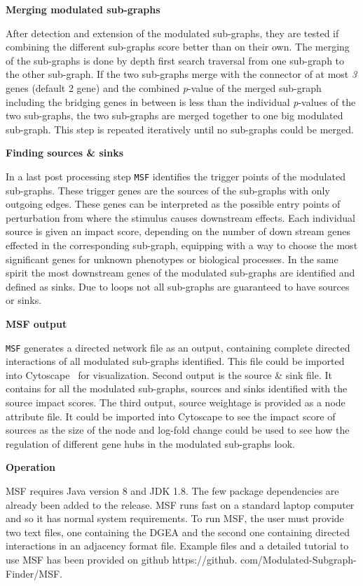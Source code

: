 \documentclass[10pt,a4paper,twocolumn]{article}
\begin{document}
	\textbf{Merging modulated sub-graphs}
	
	After detection and extension of the modulated sub-graphs, they are tested
	if combining the different sub-graphs score better than on their own. The merging of the sub-graphs is done by depth first search traversal from one sub-graph to the other sub-graph. If the two sub-graphs merge
	with the connector of at most \emph{3} genes (default 2 gene) and the
	combined \textit{p}-value of the merged sub-graph including the bridging
	genes in between is less than the individual \textit{p}-values of the two
	sub-graphs, the two sub-graphs are merged together to one big modulated
	sub-graph. This step is repeated iteratively until no sub-graphs could be
	merged.\newline
	
	\textbf{Finding sources \& sinks}
	
	In a last post processing step \texttt{MSF} identifies the trigger points
	of the modulated sub-graphs. These trigger genes are the sources of the
	sub-graphs with only outgoing edges. These genes can be interpreted as the
	possible entry points of perturbation from where the stimulus causes
	downstream effects. Each individual source is given an impact score, depending on the number of down stream genes effected in the corresponding sub-graph, equipping with a way to choose the most significant genes for unknown phenotypes or biological processes. In the same spirit the most downstream genes of the
	modulated sub-graphs are identified and defined as sinks. Due to loops not all
	sub-graphs are guaranteed to have sources or sinks.
	
	
	\textbf{MSF output}
	
	\texttt{MSF} generates a directed network file as an output, containing complete directed interactions of all modulated sub-graphs identified. This file could be imported into Cytoscape~\cite{Cyto} for visualization. Second output is the source \& sink file. It contains for all the modulated sub-graphs, sources and sinks identified with the source impact scores. The third output, source weightage is provided as a node attribute file. It could be imported into Cytoscape to see the impact score of sources as the size of the node and log-fold change could be used to see how the regulation of different gene hubs in the modulated sub-graphs look.
	
	\textbf{Operation}
	
	MSF requires Java version 8 and JDK 1.8. The few package dependencies are already been added to the release. MSF runs fast on a standard laptop computer and so it has normal system requirements. To run MSF, the user must provide two text files, one containing the DGEA and the second one containing directed interactions in an adjacency format file. Example files and a detailed tutorial to use MSF has been provided on github https://github. com/Modulated-Subgraph-Finder/MSF.
	
\end{document}

